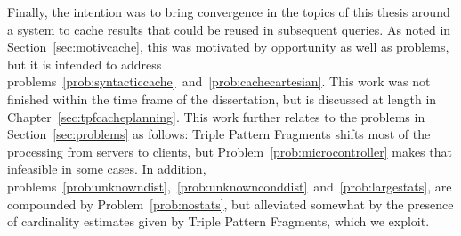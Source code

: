 Finally, the intention was to bring convergence in the topics of this
thesis around a system to cache results that could be reused in
subsequent queries. As noted in Section~\ref{sec:motivcache}, this was
motivated by opportunity as well as problems, but it is intended to
address
problems~\ref{prob:syntacticcache}~and~\ref{prob:cachecartesian}. This
work was not finished within the time frame of the dissertation, but
is discussed at length in Chapter~\ref{sec:tpfcacheplanning}. This
work further relates to the problems in Section~\ref{sec:problems} as follows:
Triple Pattern Fragments shifts most of the processing from servers to
clients, but Problem~\ref{prob:microcontroller} makes that infeasible
in some cases.  In addition,
problems~\ref{prob:unknowndist},~\ref{prob:unknownconddist}~and~\ref{prob:largestats},
are compounded by Problem~\ref{prob:nostats}, but alleviated somewhat
by the presence of cardinality estimates given by Triple Pattern
Fragments, which we exploit.


